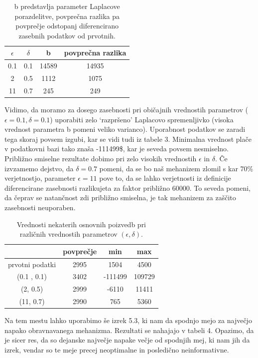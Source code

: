 \documentclass[12pt,a4paper]{amsart}
\theoremstyle{definition} %
\theoremstyle{plain} %
\begin{document}
\begin{table}[h]
\begin{center}
 \begin{tabular}{| c | c | c | c |} 
 \hline
 \textbf{$\epsilon$} & \textbf{$\delta$} & b & povprečna razlika  \\ [0.5ex] 
 \hline
 0.1 & 0.1 & 14589 & 14935  \\ 
 \hline
 2 & 0.5 & 1112 & 1075\\
 \hline
 11 & 0.7 & 245 & 249 \\
 \hline
\end{tabular}
\caption{b predstavlja parameter Laplacove porazdelitve, povprečna razlika pa povprečje odstopanj diferencirano zasebnih podatkov od prvotnih. }
\end{center}
\end{table}
Vidimo, da moramo za dosego zasebnosti pri običajnih vrednostih parametrov ($\epsilon = 0.1, \delta = 0.1$) uporabiti zelo `razpršeno' Laplacovo spremenljivko (visoka vrednost parametra b pomeni veliko varianco). Uporabnost podatkov se zaradi tega skoraj povsem izgubi, kar se vidi tudi iz tabele 3. Minimalna vrednost plače v podatkovni bazi tako znaša -111499\$, kar je seveda povsem nesmiselno. Približno smiselne rezultate dobimo pri zelo visokih vrednostih $\epsilon$ in $\delta$. Če izvzamemo dejstvo, da $\delta = 0.7$ pomeni, da se bo naš mehanizem zlomil s kar 70\% verjetnostjo, parameter $\epsilon = 11$ pove to, da se lahko verjetnosti iz definicije diferencirane zasebnosti razlikujeta za faktor približno 60000. To seveda pomeni, da čeprav se natančnost zdi približno smiselna, je tak mehanizem za zaščito zasebnosti neuporaben.
\begin{table}[h]
\begin{center}
 \begin{tabular}{| c | c | c | c |} 
 \hline
 & povprečje & min & max  \\ [0.5ex] 
 \hline
 prvotni podatki & 2995 & 1504 & 4500  \\ 
 \hline
 (0.1 , 0.1) & 3402 & -111499 & 109729\\
 \hline
 (2, 0.5) & 2999 & -6110 & 11411 \\
 \hline
 (11, 0.7) & 2990 & 765 & 5360 \\
 \hline
\end{tabular}
\caption{Vrednosti nekaterih osnovnih poizvedb pri različnih vrednostih parametrov $(\epsilon, \delta)$. }
\end{center}
\end{table}
Na tem mestu lahko uporabimo še izrek 5.3, ki nam da spodnjo mejo za največjo napako obravnavanega mehanizma. Rezultati se nahajajo v tabeli 4. Opazimo, da je sicer res, da so dejanske največje napake večje od spodnjih mej, ki nam jih da izrek, vendar so te meje precej neoptimalne in posledično neinformativne.
\end{document}
